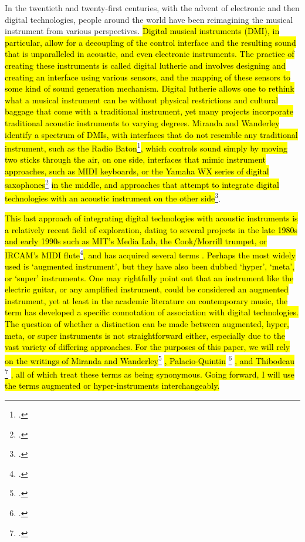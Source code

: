 \documentclass[12pt,twoside,maitrise]{dms_ks}
\theoremstyle{definition}
\begin{document}

In the twentieth and twenty-first centuries, with the advent of electronic and then digital technologies, people around the world have been reimagining the musical instrument from various perspectives. 
\hl{Digital musical instruments (DMI), in particular, allow for a decoupling of the control interface and the resulting sound that is unparalleled in acoustic, and even electronic instruments.
The practice of creating these instruments is called digital lutherie and involves designing and creating an interface using various sensors, and the mapping of these sensors to some kind of sound generation mechanism.
Digital lutherie allows one to rethink what a musical instrument can be without physical restrictions and cultural baggage that come with a traditional instrument, yet many projects incorporate traditional acoustic instruments to varying degrees. 
Miranda and Wanderley identify a spectrum of DMIs, with interfaces that do not resemble any traditional instrument, such as the Radio Baton}\footcite{miguel_ragussi_max_2013}\hl{, which controls sound simply by moving two sticks through the air, on one side, interfaces that mimic instrument approaches, such as MIDI keyboards, or the Yamaha WX series of digital saxophones}\footcite{mkirino01_yamaha_2014}\hl{ in the middle, and approaches that attempt to integrate digital technologies with an acoustic instrument on the other side}\footcite[19-20]{miranda_new_2006}.



\hl{This last approach of integrating digital technologies with acoustic instruments is a relatively recent field of exploration, dating to several projects in the late 1980s and early 1990s such as MIT's Media Lab, the Cook/Morrill trumpet, or IRCAM's MIDI flute}\footcite[22--25]{miranda_new_2006}\hl{, and has acquired several terms .
Perhaps the most widely used is `augmented instrument', but they have also been dubbed `hyper', `meta', or `super' instruments.
One may rightfully point out that an instrument like the electric guitar, or any amplified instrument, could be considered an augmented instrument, yet at least in the academic literature on contemporary music, the term has developed a specific connotation of association with digital technologies. 
The question of whether a distinction can be made between augmented, hyper, meta, or super instruments is not straightforward either, especially due to the vast variety of differing approaches.
For the purposes of this paper, we will rely on the writings of Miranda and Wanderley}\footcite[21]{miranda_new_2006} \hl{, Palacio-Quintin} \footcite[25]{palacio-quintin_composition_2012-1} \hl{, and Thibodeau } \footcite[1]{thibodeau_trumpet_2011} \hl{, all of which treat these terms as being synonymous.
Going forward, I will use the terms augmented or hyper-instruments interchangeably.}
\end{document}
